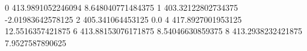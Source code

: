 0 413.9891052246094 8.648040771484375
1 403.32122802734375 -2.01983642578125
2 405.341064453125 0.0
4 417.8927001953125 12.5516357421875
6 413.88153076171875 8.54046630859375
8 413.2938232421875 7.9527587890625
